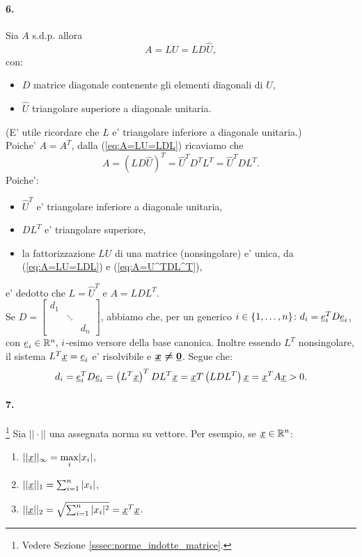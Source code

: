 \paragraph{6.} Sia $A$ s.d.p. allora
\begin{equation}\label{eq:A=LU=LDL}
	A = LU = L D \hat{U},
\end{equation}
con:
\begin{itemize}
	\item $D$ matrice diagonale contenente gli elementi diagonali di $U$,
	\item $\hat{U}$ triangolare superiore a diagonale unitaria.
\end{itemize}
(E' utile ricordare che $L$ e' triangolare inferiore a diagonale unitaria.)\\
Poiche' $A=A^T$, dalla (\ref{eq:A=LU=LDL}) ricaviamo che
\begin{equation}\label{eq:A=U^TDL^T}
	A = (L D \hat{U})^T = \hat{U}^T D^T L^T = \hat{U}^T D L^T.
\end{equation}
Poiche':
\begin{itemize}
	\item $\hat{U}^T$ e' triangolare inferiore a diagonale unitaria,
	\item $DL^T$ e' triangolare superiore,
	\item la fattorizzazione $LU$ di una matrice (nonsingolare) e' unica, da (\ref{eq:A=LU=LDL}) e (\ref{eq:A=U^TDL^T}),
\end{itemize}
e' dedotto che $L=\hat{U}^T$ e $A=LDL^T$.\\
Se $D =
\begin{bmatrix}
	d_1\\
	&\ddots\\
	& & d_n
\end{bmatrix}$, abbiamo che, per un generico $i\in\{1,\hdots, n\}\colon d_i = \uline e_i^T D \uline e_i$, con $\uline e_i\in\mathbb{R}^n,\, i$-esimo versore della base canonica. Inoltre essendo $L^T$ nonsingolare, il sistema $L^T\uline x = \uline e_i$ e' risolvibile e $\boldsymbol{\uline x\neq \uline 0}$. Segue che:
\begin{equation*}
	d_i = \uline e_i^T D \uline e_i = \left(L^T\uline x\right)^T D L^T \uline x =\uline x T \left(LDL^T\right) \uline x = \uline x^T A \uline x > 0.
\end{equation*}

\paragraph{7.}\footnote{Vedere Sezione \ref{sssec:norme_indotte_matrice}.} Sia $||\cdot||$ una assegnata norma su vettore. Per esempio, se $\uline x\in\mathbb{R}^n$:
\begin{enumerate}
	\item $||\uline x||_\infty = \underset{i}{\max}|x_i|$,
	\item $||\uline x||_1 = \sum_{i=1}^{n}|x_i|$,
	\item $||\uline x||_2 = \sqrt{\sum_{i=1}^{n}|x_i|^2} = \uline x^T\uline x$.
\end{enumerate}

